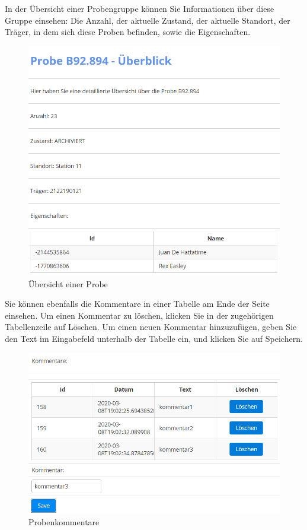 \documentclass[enabledeprecatedfontcommands,fontsize=12pt,paper=a4,twoside]{scrartcl}
\begin{document}
In der Übersicht einer Probengruppe können Sie Informationen über diese Gruppe einsehen: Die Anzahl, der aktuelle Zustand, der aktuelle Standort, der Träger, in dem sich diese Proben befinden, sowie die Eigenschaften. \\


\begin{figure}[h!]
\begin{center}
 \includegraphics[width=\textwidth]{screenshots/t/probeubersicht.png}
  \caption{Übersicht einer Probe}
  \label{fig:boat1}
\end{center}
\end{figure}

Sie können ebenfalls die Kommentare in einer Tabelle am Ende  der Seite einsehen. Um einen Kommentar zu löschen, klicken Sie in der zugehörigen Tabellenzeile auf Löschen. Um einen neuen Kommentar hinzuzufügen, geben Sie den Text im Eingabefeld unterhalb der Tabelle ein, und klicken Sie auf Speichern.  \\

\begin{figure}[h!]
\begin{center}
 \includegraphics[width=\textwidth]{screenshots/t/probekommentare.png}
  \caption{Probenkommentare}
  \label{fig:boat1}
\end{center}
\end{figure}
\end{document}

